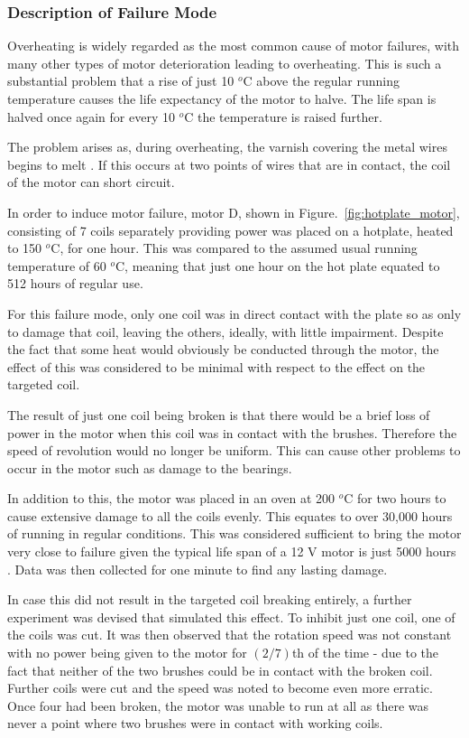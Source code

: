 \subsubsection{Description of Failure Mode}

Overheating is widely regarded as the most common cause of motor failures, with many other types of motor deterioration leading to overheating. This is such a substantial problem that a rise of just 10 $^o$C above the regular running temperature causes the life expectancy of the motor to halve. The life span is halved once again for every 10 $^o$C the temperature is raised further.%

The problem arises as, during overheating, the varnish covering the metal wires begins to melt \cite{wagner1993effects}. If this occurs at two points of wires that are in contact, the coil of the motor can short circuit.


In order to induce motor failure, motor D, shown in Figure.~\ref{fig:hotplate_motor}, consisting of 7 coils separately providing power was placed on a hotplate, heated to 150 $^o$C, for one hour. This was compared to the assumed usual running temperature of 60 $^o$C, meaning that just one hour on the hot plate equated to 512 hours of regular use.

For this failure mode, only one coil was in direct contact with the plate so as only to damage that coil, leaving the others, ideally, with little impairment. Despite the fact that some heat would obviously be conducted through the motor, the effect of this was considered to be minimal with respect to the effect on the targeted coil.

The result of just one coil being broken is that there would be a brief loss of power in the motor when this coil was in contact with the brushes. Therefore the speed of revolution would no longer be uniform. This can cause other problems to occur in the motor such as damage to the bearings. 

In addition to this, the motor was placed in an oven at 200 $^o$C for two hours to cause extensive damage to all the coils evenly. This equates to over 30,000 hours of running in regular conditions. This was considered sufficient to bring the motor very close to failure given the typical life span of a 12 V motor is just 5000 hours \cite{jones1973selecting}.
Data was then collected for one minute to find any lasting damage.

In case this did not result in the targeted coil breaking entirely, a further experiment was devised that simulated this effect. To inhibit just one coil, one of the coils was cut. It was then observed that the rotation speed was not constant with no power being given to the motor for $({2}/{7})$th of the time - due to the fact that neither of the two brushes could be in contact with the broken coil. Further coils were cut and the speed was noted to become even more erratic. Once four had been broken, the motor was unable to run at all as there was never a point where two brushes were in contact with working coils.


